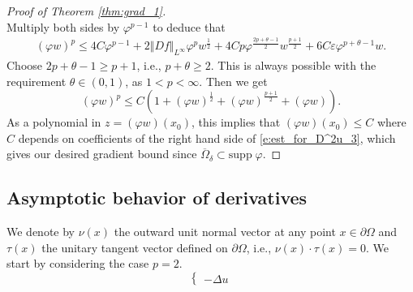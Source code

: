 \documentclass[12pt,reqno]{amsart}
\numberwithin{figure}{section}
\theoremstyle{plain}
\theoremstyle{remark}
\numberwithin{equation}{section}
\begin{document}
\begin{proof}[Proof of Theorem \ref{thm:grad_1}]
\begin{equation*}
\end{equation*}
Multiply both sides by $\varphi^{p-1}$ to deduce that
\begin{align*}
    (\varphi w)^p \leq 4C\varphi^{p-1} + 2\Vert Df\Vert_{L^\infty}\varphi^p w^{\frac{1}{2}} + 4Cp \varphi^{\frac{2p+\theta - 1}{2}}w^{\frac{p+1}{2}} + 6C\varepsilon \varphi^{p+\theta - 1}w.
\end{align*}
Choose $2p+\theta -1 \geq p+1$, i.e., $p+\theta\geq 2$. This is always possible with the requirement $\theta \in (0,1)$, as $1<p <\infty$. Then we get
\begin{equation}\label{e:est_for_D^2u_3}
    (\varphi w)^p \leq C\left(1+ (\varphi w)^\frac{1}{2} + (\varphi w)^\frac{p+1}{2} +(\varphi w)\right).
\end{equation}
As a polynomial in $z = (\varphi w)(x_0)$, this implies that $(\varphi w)(x_0)\leq C$ where $C$ depends on coefficients of the right hand side of \eqref{e:est_for_D^2u_3}, which gives our desired gradient bound since $\overline{\Omega}_\delta\subset \mathrm{supp}\;\varphi$.
\end{proof}

\subsection*{Asymptotic behavior of derivatives}
We denote by $\nu(x)$ the outward unit normal vector at any point $x\in \partial{\Omega}$ and $\tau(x)$ the unitary tangent vector defined on $\partial{\Omega}$, i.e., $\nu(x)\cdot\tau(x) = 0$. We start by considering the case $p=2$.
\begin{equation*}
    \begin{cases}
    -\Delta u 
    \end{cases}
\end{equation*}
\end{document}
